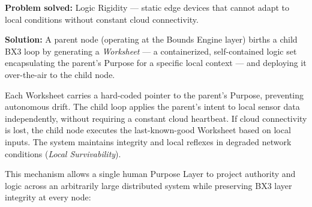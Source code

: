 \documentclass[12pt]{article}
\begin{document}
\textbf{Problem solved:} Logic Rigidity --- static edge devices that cannot adapt to local conditions without constant cloud connectivity.

\textbf{Solution:} A parent node (operating at the Bounds Engine layer) births a child BX3 loop by generating a \textit{Worksheet} --- a containerized, self-contained logic set encapsulating the parent's Purpose for a specific local context --- and deploying it over-the-air to the child node.

Each Worksheet carries a hard-coded pointer to the parent's Purpose, preventing autonomous drift. The child loop applies the parent's intent to local sensor data independently, without requiring a constant cloud heartbeat. If cloud connectivity is lost, the child node executes the last-known-good Worksheet based on local inputs. The system maintains integrity and local reflexes in degraded network conditions (\textit{Local Survivability}).

This mechanism allows a single human Purpose Layer to project authority and logic across an arbitrarily large distributed system while preserving BX3 layer integrity at every node:
\end{document}

